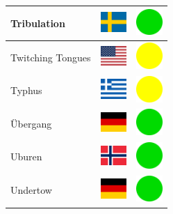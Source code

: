 \documentclass[12pt, a4paper, twoside]{report}
\begin{document}
\begin{center}
\begin{longtable}{|p{5cm}|p{2cm}|p{2cm}|}
 Tribulation                                                & \includegraphics[width=1cm]{../4x3/se} &   \includegraphics[width=1cm]{../likes/y} \\ \hline
 Twitching Tongues                                          & \includegraphics[width=1cm]{../4x3/us} &   \includegraphics[width=1cm]{../likes/m} \\ \hline
 Typhus                                                     & \includegraphics[width=1cm]{../4x3/gr} &   \includegraphics[width=1cm]{../likes/m} \\ \hline
 Übergang                                                   & \includegraphics[width=1cm]{../4x3/de} &   \includegraphics[width=1cm]{../likes/y} \\ \hline
 Uburen                                                     & \includegraphics[width=1cm]{../4x3/no} &   \includegraphics[width=1cm]{../likes/y} \\ \hline
 Undertow                                                   & \includegraphics[width=1cm]{../4x3/de} &   \includegraphics[width=1cm]{../likes/y} \\ \hline

\end{longtable}
\end{center}
\end{document}
